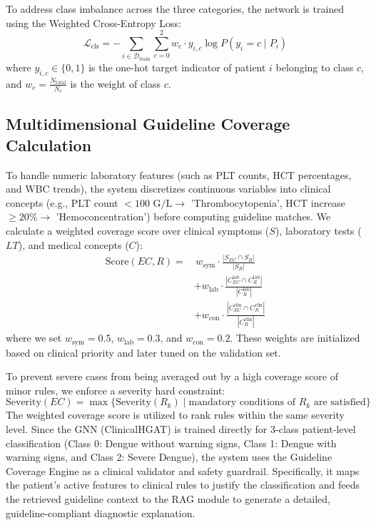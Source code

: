 \documentclass[conference]{IEEEtran}
\begin{document}
To address class imbalance across the three categories, the network is trained using the Weighted Cross-Entropy Loss:
\begin{equation}
    \mathcal{L}_{\text{cls}} = -\sum_{i \in \mathcal{D}_{\text{train}}} \sum_{c=0}^2 w_c \cdot y_{i,c} \log P(y_i = c \mid P_i)
\end{equation}
where $y_{i,c} \in \{0, 1\}$ is the one-hot target indicator of patient $i$ belonging to class $c$, and $w_c = \frac{N_{\text{total}}}{N_c}$ is the weight of class $c$.

\subsection{Multidimensional Guideline Coverage Calculation}
To handle numeric laboratory features (such as PLT counts, HCT percentages, and WBC trends), the system discretizes continuous variables into clinical concepts (e.g., PLT count $< 100 \text{ G/L} \rightarrow$ 'Thrombocytopenia', HCT increase $\ge 20\% \rightarrow$ 'Hemoconcentration') before computing guideline matches. We calculate a weighted coverage score over clinical symptoms ($S$), laboratory tests ($LT$), and medical concepts ($C$):
\begin{equation}
\begin{aligned}
    \text{Score}(EC, R) = & \, w_{\text{sym}} \cdot \frac{|S_{EC} \cap S_R|}{|S_R|} \\
    & + w_{\text{lab}} \cdot \frac{|C^{\text{lab}}_{EC} \cap C^{\text{lab}}_R|}{|C^{\text{lab}}_R|} \\
    & + w_{\text{con}} \cdot \frac{|C^{\text{clin}}_{EC} \cap C^{\text{clin}}_R|}{|C^{\text{clin}}_R|}
\end{aligned}
\end{equation}
where we set $w_{\text{sym}} = 0.5$, $w_{\text{lab}} = 0.3$, and $w_{\text{con}} = 0.2$. These weights are initialized based on clinical priority and later tuned on the validation set.

To prevent severe cases from being averaged out by a high coverage score of minor rules, we enforce a severity hard constraint:
\begin{equation}
    \text{Severity}(EC) = \max \{ \text{Severity}(R_k) \mid \text{mandatory conditions of } R_k \text{ are satisfied} \}
\end{equation}
The weighted coverage score is utilized to rank rules within the same severity level. Since the GNN (ClinicalHGAT) is trained directly for 3-class patient-level classification (Class 0: Dengue without warning signs, Class 1: Dengue with warning signs, and Class 2: Severe Dengue), the system uses the Guideline Coverage Engine as a clinical validator and safety guardrail. Specifically, it maps the patient's active features to clinical rules to justify the classification and feeds the retrieved guideline context to the RAG module to generate a detailed, guideline-compliant diagnostic explanation.
\end{document}
